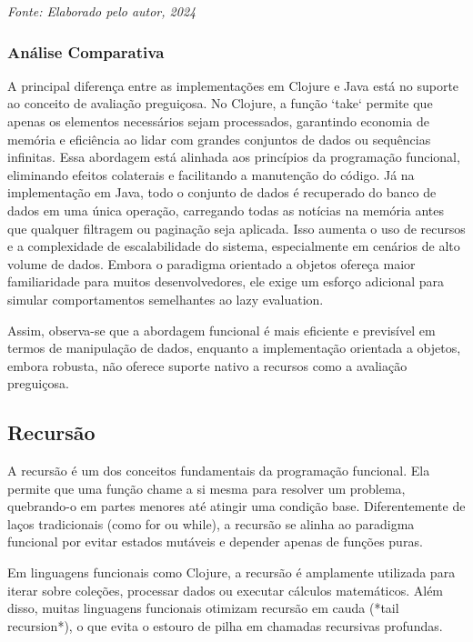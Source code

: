 \begin{center}
    \textit{Fonte: Elaborado pelo autor, 2024} 
\end{center}


\subsubsection*{Análise Comparativa}

A principal diferença entre as implementações em Clojure e Java está no suporte ao conceito de avaliação preguiçosa. No Clojure, a função `take` permite que apenas os elementos necessários sejam processados, garantindo economia de memória e eficiência ao lidar com grandes conjuntos de dados ou sequências infinitas. Essa abordagem está alinhada aos princípios da programação funcional, eliminando efeitos colaterais e facilitando a manutenção do código. Já na implementação em Java, todo o conjunto de dados é recuperado do banco de dados em uma única operação, carregando todas as notícias na memória antes que qualquer filtragem ou paginação seja aplicada. Isso aumenta o uso de recursos e a complexidade de escalabilidade do sistema, especialmente em cenários de alto volume de dados. Embora o paradigma orientado a objetos ofereça maior familiaridade para muitos desenvolvedores, ele exige um esforço adicional para simular comportamentos semelhantes ao lazy evaluation.

Assim, observa-se que a abordagem funcional é mais eficiente e previsível em termos de manipulação de dados, enquanto a implementação orientada a objetos, embora robusta, não oferece suporte nativo a recursos como a avaliação preguiçosa.

\subsection{Recursão}

A recursão é um dos conceitos fundamentais da programação funcional. Ela permite que uma função chame a si mesma para resolver um problema, quebrando-o em partes menores até atingir uma condição base. Diferentemente de laços tradicionais (como for ou while), a recursão se alinha ao paradigma funcional por evitar estados mutáveis e depender apenas de funções puras.

Em linguagens funcionais como Clojure, a recursão é amplamente utilizada para iterar sobre coleções, processar dados ou executar cálculos matemáticos. Além disso, muitas linguagens funcionais otimizam recursão em cauda (*tail recursion*), o que evita o estouro de pilha em chamadas recursivas profundas.


